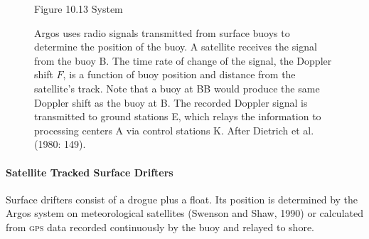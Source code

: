 \begin{figure}[t!]
\footnotesize
Figure 10.13 System\rule{0mm}{4ex} Argos uses
radio signals transmitted from surface buoys to determine the position
of the buoy. A satellite receives the signal from the buoy B. The time
rate of change of the signal, the Doppler shift $F$, is a function of
buoy position and distance from the satellite's track. Note that a
buoy at BB would produce the same Doppler shift as the buoy at B. The
recorded Doppler signal is transmitted to ground stations E, which
relays the information to processing centers A via control stations
K. After Dietrich et al. (1980: 149).
\label{fig:argos}
\vspace{-4ex}
\end{figure}

\paragraph{Satellite Tracked Surface Drifters}
Surface drifters consist of a drogue plus a
float. Its position is determined by the Argos
system on meteorological satellites (Swenson and Shaw, 1990) or
calculated from \textsc{gps} data recorded continuously by the buoy
and relayed to shore.

